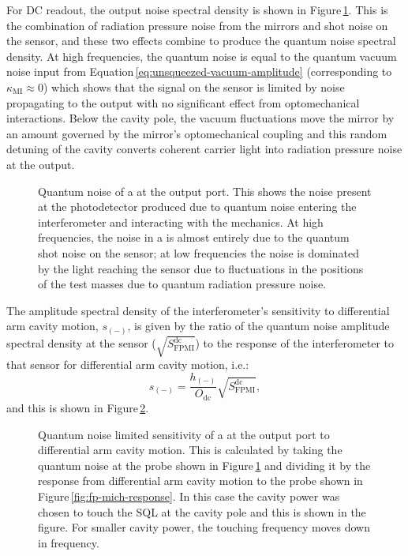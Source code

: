 For \gls{DC} readout, the output noise spectral density is shown in Figure\,\ref{fig:fp-mich-noise}. This is the combination of radiation pressure noise from the mirrors and shot noise on the sensor, and these two effects combine to produce the quantum noise spectral density. At high frequencies, the quantum noise is equal to the quantum vacuum noise input from Equation\,\ref{eq:unsqueezed-vacuum-amplitude} (corresponding to $\kappa_{\text{MI}} \approx 0$) which shows that the signal on the sensor is limited by noise propagating to the output with no significant effect from optomechanical interactions. Below the cavity pole, the vacuum fluctuations move the mirror by an amount governed by the mirror's optomechanical coupling and this random detuning of the cavity converts coherent carrier light into radiation pressure noise at the output.

\begin{figure}
  \centering
  
  \caption[Quantum noise of a \FPMI{} at the output port]{\label{fig:fp-mich-noise}Quantum noise of a \FPMI{} at the output port. This shows the noise present at the photodetector produced due to quantum noise entering the interferometer and interacting with the mechanics. At high frequencies, the noise in a \MI{} is almost entirely due to the quantum shot noise on the sensor; at low frequencies the noise is dominated by the light reaching the sensor due to fluctuations in the positions of the test masses due to quantum radiation pressure noise.}
\end{figure}

The amplitude spectral density of the interferometer's sensitivity to differential arm cavity motion, $s_{\left( - \right)}$, is given by the ratio of the quantum noise amplitude spectral density at the sensor ($\sqrt{S_{\text{FPMI}}^{\text{dc}}}$) to the response of the interferometer to that sensor for differential arm cavity motion, i.e.:
\begin{equation}
  s_{\left( - \right)} = \frac{h_{\left( - \right)}}{O_{\text{dc}}} \sqrt{S_{\text{FPMI}}^{\text{dc}}},
\end{equation}
and this is shown in Figure\,\ref{fig:fp-mich-sensitivity}.

\begin{figure}
  \centering
  
  \caption[Sensitivity of a \FPMI{} at the output port to differential arm cavity motion]{\label{fig:fp-mich-sensitivity}Quantum noise limited sensitivity of a \FPMI{} at the output port to differential arm cavity motion. This is calculated by taking the quantum noise at the probe shown in Figure\,\ref{fig:fp-mich-noise} and dividing it by the response from differential arm cavity motion to the probe shown in Figure\,\ref{fig:fp-mich-response}. In this case the cavity power was chosen to touch the \gls{SQL} at the cavity pole and this is shown in the figure. For smaller cavity power, the touching frequency moves down in frequency.}
\end{figure}

